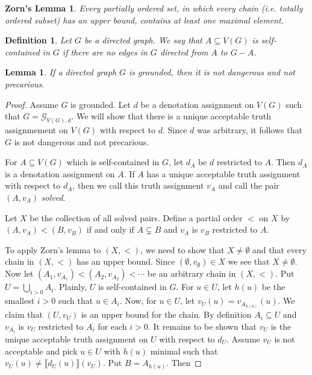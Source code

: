 \documentclass[12pt]{article}
\newtheorem{lem}[thm]{Lemma}
\newtheorem{defn}{Definition}
\newtheorem*{zorn}{Zorn's Lemma}
\theoremstyle{remark}
\newcommand{\fancy}[1]{\mathcal{#1}}
\def\G{\fancy{G}}
\begin{document}
\begin{zorn}
Every partially ordered set, in which every chain (i.e. totally ordered subset) has an upper bound, contains at least one maximal element.
\end{zorn}

\begin{defn}
Let $G$ be a directed graph.  We say that $A \subseteq V(G)$ is \emph{self-contained} in $G$ if there are no edges in $G$ directed from $A$ to $G - A$.  
\end{defn}

\begin{lem}\label{GroundedNotDangerous}
If a directed graph $G$ is grounded, then it is not dangerous and not precarious.
\end{lem}
\begin{proof}
Assume $G$ is grounded.  Let $d$ be a denotation assignment on $V(G)$ such that $G = \G_{V(G), d}$. We will show that there is a unique acceptable truth assignmement on $V(G)$ with respect to $d$.  Since $d$ was arbitrary, it follows that $G$ is not dangerous and not precarious.\newline

For $A \subseteq V(G)$ which is self-contained in $G$, let $d_A$ be $d$ restricted to $A$.  Then $d_A$ is a denotation assignment on $A$.  If $A$ has a unique acceptable truth assignment with respect to $d_A$, then we call this truth assignment $v_A$ and call the pair $(A, v_A)$ \emph{solved}.\newline

Let $X$ be the collection of all solved pairs.  Define a partial order $<$ on $X$ by $(A, v_A) < (B, v_B)$ if and only if $A \subsetneq B$ and $v_A$ is $v_B$ restricted to $A$.\newline

To apply Zorn's lemma to $(X, <)$, we need to show that $X \neq \emptyset$ and that every chain in  $(X, <)$ has an upper bound. Since $(\emptyset, v_\emptyset) \in X$ we see that $X \neq \emptyset$.  Now let $(A_1, v_{A_1}) < (A_2, v_{A_2}) < \cdots$ be an arbitrary chain in $(X, <)$.  Put $U = \bigcup_{i > 0} A_i$. Plainly, $U$ is self-contained in $G$. For $u \in U$, let $h(u)$ be the smallest $i > 0$ such that $u \in A_i$.  Now, for $u \in U$, let $v_U(u) = v_{A_{h(u)}}(u)$.  We claim that $(U, v_U)$ is an upper bound for the chain.  By definition $A_i \subseteq U$ and $v_{A_i}$ is $v_U$ restricted to $A_i$ for each $i > 0$.  It remains to be shown that $v_U$ is the unique acceptable truth assignment on $U$ with respect to $d_U$.  Assume $v_U$ is not acceptable and pick $u \in U$ with $h(u)$ minimal such that $v_U(u) \neq \llbracket d_U(u)\rrbracket(v_U)$.  Put $B = A_{h(u)}$. Then


\end{proof}
\end{document}
